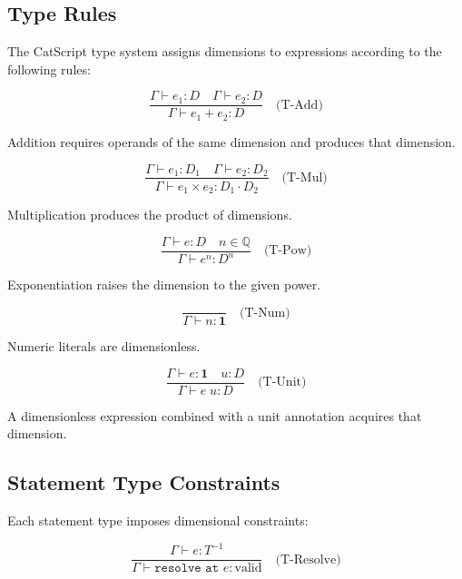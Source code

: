 \documentclass[twocolumn,10pt]{article}
\begin{document}
\subsection{Type Rules}

The CatScript type system assigns dimensions to expressions according to the following rules:

\begin{equation}
    \frac{\Gamma \vdash e_1 : D \quad \Gamma \vdash e_2 : D}{\Gamma \vdash e_1 + e_2 : D}
    \quad \text{(T-Add)}
\end{equation}

Addition requires operands of the same dimension and produces that dimension.

\begin{equation}
    \frac{\Gamma \vdash e_1 : D_1 \quad \Gamma \vdash e_2 : D_2}{\Gamma \vdash e_1 \times e_2 : D_1 \cdot D_2}
    \quad \text{(T-Mul)}
\end{equation}

Multiplication produces the product of dimensions.

\begin{equation}
    \frac{\Gamma \vdash e : D \quad n \in \mathbb{Q}}{\Gamma \vdash e^n : D^n}
    \quad \text{(T-Pow)}
\end{equation}

Exponentiation raises the dimension to the given power.

\begin{equation}
    \frac{}{\Gamma \vdash n : \mathbf{1}}
    \quad \text{(T-Num)}
\end{equation}

Numeric literals are dimensionless.

\begin{equation}
    \frac{\Gamma \vdash e : \mathbf{1} \quad u : D}{\Gamma \vdash e \; u : D}
    \quad \text{(T-Unit)}
\end{equation}

A dimensionless expression combined with a unit annotation acquires that dimension.

\subsection{Statement Type Constraints}

Each statement type imposes dimensional constraints:

\begin{equation}
    \frac{\Gamma \vdash e : T^{-1}}{\Gamma \vdash \texttt{resolve at } e : \text{valid}}
    \quad \text{(T-Resolve)}
\end{equation}
\end{document}
